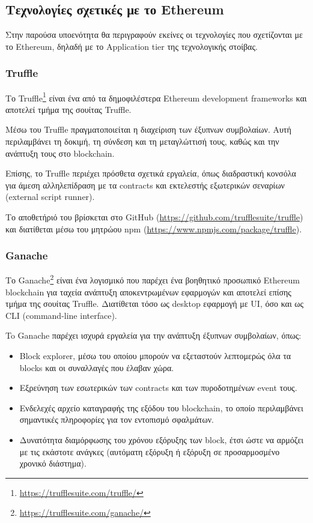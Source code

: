 \subsection{Τεχνολογίες σχετικές με το Ethereum} \label{subsection:4-3-3-ethereum-technologies}

Στην παρούσα υποενότητα θα περιγραφούν εκείνες οι τεχνολογίες που σχετίζονται με το Ethereum, δηλαδή με το Application tier της τεχνολογικής στοίβας.

\subsubsection{Truffle}


Το Truffle\footnote{\url{https://trufflesuite.com/truffle/}} είναι ένα από τα δημοφιλέστερα Ethereum development frameworks και αποτελεί τμήμα της σουίτας Truffle.

Μέσω του Truffle πραγματοποιείται η διαχείριση των έξυπνων συμβολαίων. Αυτή περιλαμβάνει τη δοκιμή, τη σύνδεση και τη μεταγλώττισή τους, καθώς και την ανάπτυξη τους στο blockchain.

Επίσης, το Truffle περιέχει πρόσθετα σχετικά εργαλεία, όπως διαδραστική κονσόλα για άμεση αλληλεπίδραση με τα contracts  και εκτελεστής εξωτερικών σεναρίων (external script runner). 

Το αποθετήριό του βρίσκεται στο GitHub (\url{https://github.com/trufflesuite/truffle}) και διατίθεται μέσω του μητρώου npm (\url{https://www.npmjs.com/package/truffle}).

\subsubsection{Ganache}


Το Ganache\footnote{\url{https://trufflesuite.com/ganache/}} είναι ένα λογισμικό που παρέχει ένα βοηθητικό προσωπικό Ethereum blockchain για ταχεία ανάπτυξη αποκεντρωμένων εφαρμογών και αποτελεί επίσης τμήμα της σουίτας Truffle. Διατίθεται τόσο ως desktop εφαρμογή με UI, όσο και ως CLI (command-line interface).

To Ganache παρέχει ισχυρά εργαλεία για την ανάπτυξη έξυπνων συμβολαίων, όπως:
\begin{itemize}
	\item Block explorer, μέσω του οποίου μπορούν να εξεταστούν λεπτομερώς όλα τα blocks και οι συναλλαγές που έλαβαν χώρα.
	\item Εξρεύνηση των εσωτερικών των contracts και των πυροδοτημένων event τους.
	\item Ενδελεχές αρχείο καταγραφής της εξόδου του blockchain, το οποίο περιλαμβάνει σημαντικές πληροφορίες για τον εντοπισμό σφαλμάτων.
	\item Δυνατότητα διαμόρφωσης του χρόνου εξόρυξης των block, έτσι ώστε να αρμόζει με τις εκάστοτε ανάγκες (αυτόματη εξόρυξη ή εξόρυξη σε προσαρμοσμένο χρονικό διάστημα).
\end{itemize}

